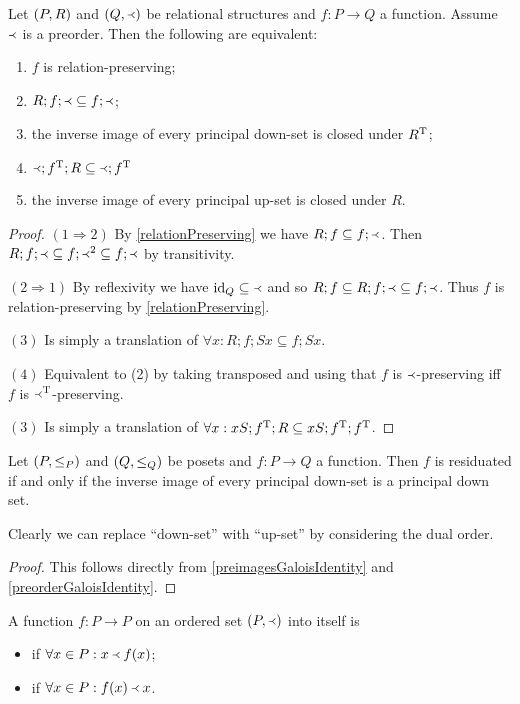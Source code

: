 \begin{proposition}
Let $\left( P,R \right)$ and $\left( Q,\Yleft \right)$ be relational structures and $f:P\to Q$ a function. Assume $\Yleft$ is a preorder. Then the following are equivalent:
\begin{enumerate}
\item $f$ is relation-preserving;
\item $R;f;\Yleft \subseteq f;\Yleft$;
\item the inverse image of every principal down-set is closed under $R^{\mathrm{T}}$;
\item $\Yleft;f^{\mathrm{T}}; R \subseteq \Yleft;f^{\mathrm{T}}$
\item the inverse image of every principal up-set is closed under $R$.
\end{enumerate}
\end{proposition}
\begin{proof}
$(1 \Rightarrow 2)$ By \ref{relationPreserving} we have $R;f \subseteq f;\Yleft$. Then $R;f;\Yleft \subseteq f;\Yleft^2 \subseteq f;\Yleft$ by transitivity.

$(2 \Rightarrow 1)$ By reflexivity we have $\operatorname{id}_Q \subseteq \Yleft$ and so $R;f \subseteq R;f;\Yleft \subseteq f;\Yleft$. Thus $f$ is relation-preserving by \ref{relationPreserving}.

$(3)$ Is simply a translation of $\forall x: R;f;Sx \subseteq f;Sx$.

$(4)$ Equivalent to (2) by taking transposed and using that $f$ is $\Yleft$-preserving iff $f$ is $\Yleft^{\mathrm{T}}$-preserving.

$(3)$ Is simply a translation of $\forall x: xS;f^{\mathrm{T}}; R \subseteq xS;f^{\mathrm{T}};f^{\mathrm{T}}$.
\end{proof}

\begin{proposition}
Let $\left( P,\leq_P \right)$ and $\left( Q,\leq_Q \right)$ be posets and $f:P\to Q$ a function. Then $f$ is residuated \textup{if and only if} the inverse image of every principal down-set is a principal down set.
\end{proposition}
Clearly we can replace ``down-set'' with ``up-set'' by considering the dual order.
\begin{proof}
This follows directly from \ref{preimagesGaloisIdentity} and \ref{preorderGaloisIdentity}.
\end{proof}

\begin{definition}
A function $f: P\to P$ on an ordered set $(P,\Yleft)$ into itself is
\begin{itemize}
\item {} if $\forall x\in P: x\Yleft f(x)$;
\item {} if $\forall x\in P: f(x)\Yleft x$.
\end{itemize}
\end{definition}

